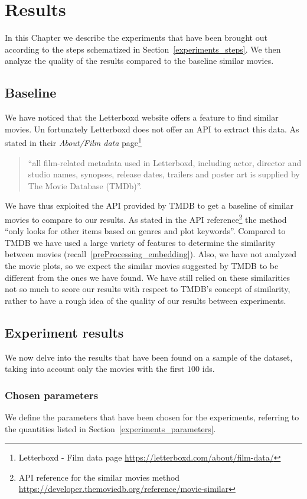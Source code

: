 \chapter{Results}\label{results}
In this Chapter we describe the experiments that have been brought out according to the steps schematized in Section~\ref{experiments_steps}. We then analyze the quality of the results compared to the baseline similar movies. 

\section{Baseline}
We have noticed that the Letterboxd website offers a feature to find similar movies. Un fortunately Letterboxd does not offer an API to extract this data. As stated in their \textit{About/Film data} page\footnote{Letterboxd - Film data page \url{https://letterboxd.com/about/film-data/}} 
\begin{quote}
    ``all film-related metadata used in Letterboxd, including actor, director and studio names, synopses, release dates, trailers and poster art is supplied by The Movie Database (TMDb)''.
\end{quote}
We have thus exploited the API provided by TMDB to get a baseline of similar movies to compare to our results. As stated in the API reference\footnote{API reference for the similar movies method \url{https://developer.themoviedb.org/reference/movie-similar}} the method ``only looks for other items based on genres and plot keywords''. Compared to TMDB we have used a large variety of features to determine the similarity between movies (recall~\ref{preProcessing_embedding}). Also, we have not analyzed the movie plots, so we expect the similar movies suggested by TMDB to be different from the ones we have found. We have still relied on these similarities not so much to score our results with respect to TMDB’s concept of similarity, rather to have a rough idea of the quality of our results between experiments.

\section{Experiment results}We now delve into the results that have been found on a sample of the dataset, taking into account only the movies with the first $100$ ids.

\subsection{Chosen parameters}
We define the parameters that have been chosen for the experiments, referring to the quantities listed in Section~\ref{experiments_parameters}.

